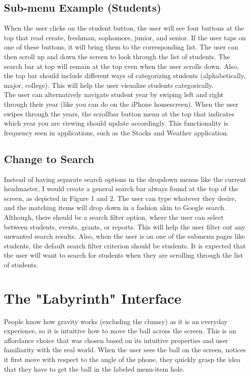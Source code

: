 \documentclass{article}
\begin{document}
\subsection{Sub-menu Example (Students)}

When the user clicks on the student button, the user will see four buttons at the top that read create, freshman, sophomore, junior, and senior.  If the user taps on one of these buttons, it will bring them to the corresponding list.  The user can then scroll up and down the screen to look through the list of students.  The search bar at top will remain at the top even when the user scrolls down.   Also, the top bar should include different ways of categorizing students (alphabetically, major, college).  This will help the user visualize students categorically.\\

The user can alternatively navigate student year by swiping left and right through their year (like you can do on the iPhone homescreen).  When the user swipes through the years, the scrollbar button menu at the top that indicates which year you are viewing should update accordingly.  This functionality is frequency seen in applications, such as the Stocks and Weather application.


\subsection{Change to Search}

Instead of having separate search options in the dropdown menus like the current headmaster, I would create a general search bar always found at the top of the screen, as depicted in Figure 1 and 2.  The user can type whatever they desire, and the matching items will drop down in a fashion akin to Google search.  Although, there should be a search filter option, where the user can select between students, events, grants, or reports.  This will help the user filter out any unwanted search results.  Also, when the user is on one of the submenu pages like students, the default search filter criterion should be students.  It is expected that the user will want to search for students when they are scrolling through the list of students.


\section{The "Labyrinth" Interface}

People know how gravity works (excluding the clumsy) as it is an everyday experience, so it is intuitive how to move the ball across the screen.  This is an affordance choice that was chosen based on its intuitive properties and user familiarity with the real world.   When the user sees the ball on the screen, notices it first move with respect to the angle of the phone, they quickly grasp the idea that they have to get the ball in the labeled menu-item hole.\\
\end{document}

